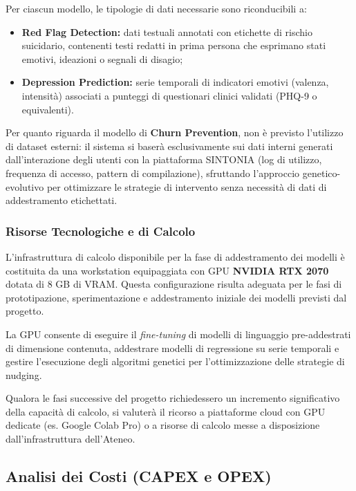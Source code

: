 Per ciascun modello, le tipologie di dati necessarie sono riconducibili a:
\begin{itemize}
    \item \textbf{Red Flag Detection:} dati testuali annotati con etichette di rischio suicidario, contenenti testi redatti in prima persona che esprimano stati emotivi, ideazioni o segnali di disagio;
    \item \textbf{Depression Prediction:} serie temporali di indicatori emotivi (valenza, intensità) associati a punteggi di questionari clinici validati (PHQ-9 o equivalenti).
\end{itemize}

Per quanto riguarda il modello di \textbf{Churn Prevention}, non è previsto l'utilizzo di dataset esterni: il sistema si baserà esclusivamente sui dati interni generati dall'interazione degli utenti con la piattaforma SINTONIA (log di utilizzo, frequenza di accesso, pattern di compilazione), sfruttando l'approccio genetico-evolutivo per ottimizzare le strategie di intervento senza necessità di dati di addestramento etichettati.

\subsubsection{Risorse Tecnologiche e di Calcolo}
\label{subsubsec:risorse_calcolo}

L'infrastruttura di calcolo disponibile per la fase di addestramento dei modelli è costituita da una workstation equipaggiata con GPU \textbf{NVIDIA RTX 2070} dotata di 8 GB di VRAM. Questa configurazione risulta adeguata per le fasi di prototipazione, sperimentazione e addestramento iniziale dei modelli previsti dal progetto.

La GPU consente di eseguire il \textit{fine-tuning} di modelli di linguaggio pre-addestrati di dimensione contenuta, addestrare modelli di regressione su serie temporali e gestire l'esecuzione degli algoritmi genetici per l'ottimizzazione delle strategie di nudging.

Qualora le fasi successive del progetto richiedessero un incremento significativo della capacità di calcolo, si valuterà il ricorso a piattaforme cloud con GPU dedicate (es. Google Colab Pro) o a risorse di calcolo messe a disposizione dall'infrastruttura dell'Ateneo.

\clearpage
\subsection{Analisi dei Costi (CAPEX e OPEX)}
\label{subsec:analisi_costi}

